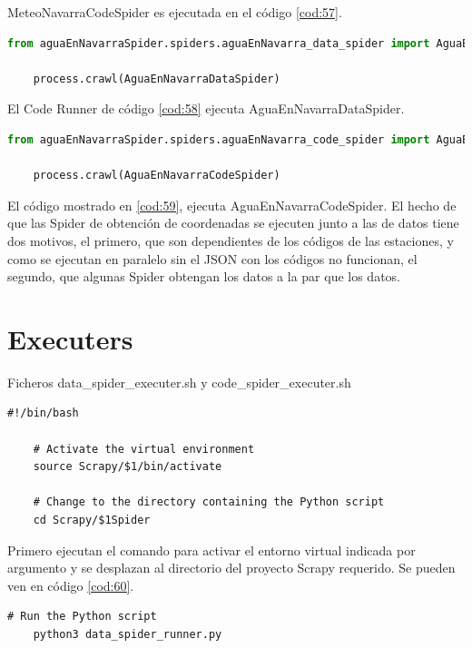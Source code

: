 MeteoNavarraCodeSpider es ejecutada en el código \ref{cod:57}.

\begin{lstlisting}[language=Python, caption={Agua en Navarra Data Runner}, label=cod:58]
	from aguaEnNavarraSpider.spiders.aguaEnNavarra_data_spider import AguaEnNavarraDataSpider
	
	process.crawl(AguaEnNavarraDataSpider)
\end{lstlisting}

El Code Runner de código \ref{cod:58} ejecuta AguaEnNavarraDataSpider.

\begin{lstlisting}[language=Python, caption={Agua en Navarra Code Runner}, label=cod:59]
	from aguaEnNavarraSpider.spiders.aguaEnNavarra_code_spider import AguaEnNavarraCodeSpider

	process.crawl(AguaEnNavarraCodeSpider)
\end{lstlisting}

El código mostrado en \ref{cod:59}, ejecuta AguaEnNavarraCodeSpider.\newline
\newline
El hecho de que las Spider de obtención de coordenadas se ejecuten junto a las de datos tiene dos motivos, el primero, que son dependientes de los códigos de las estaciones, y como se ejecutan en paralelo sin el JSON con los códigos no funcionan, el segundo, que algunas Spider obtengan los datos a la par que los datos.

\section{Executers}
Ficheros data\_spider\_executer.sh y code\_spider\_executer.sh

\begin{lstlisting}[caption={Ejecucion de entorno virtual y selección de proyecto Scrapy}, label=cod:60]
	#!/bin/bash
	
	# Activate the virtual environment
	source Scrapy/$1/bin/activate
	
	# Change to the directory containing the Python script
	cd Scrapy/$1Spider
\end{lstlisting}

Primero ejecutan el comando para activar el entorno virtual indicada por argumento y se desplazan al directorio del proyecto Scrapy requerido. Se pueden ven en código \ref{cod:60}.

\begin{lstlisting}[caption={Ejecución de data\_spider\_runner.py}, label=cod:61]
	# Run the Python script
	python3 data_spider_runner.py
\end{lstlisting}

